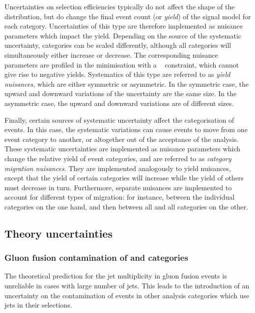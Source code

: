 Uncertainties on selection efficiencies typically do not affect the shape of the \mgg distribution, but do change the final event count (or \emph{yield}) of the signal model for each category. Uncertainties of this type are therefore implemented as nuisance parameters which impact the yield. Depending on the source of the systematic uncertainty, categories can be scaled differently, although all categories will simultaneously either increase or decrease. The corresponding nuisance parameters are profiled in the \NLL minimisation with a \lnN~\cite{1987lognormal} constraint, which cannot give rise to negative yields. Systematics of this type are referred to as \emph{yield nuisances}, which are either symmetric or asymmetric. In the symmetric case, the upward and downward variations of the uncertainty are the same size. In the asymmetric case, the upward and downward variations are of different sizes.

Finally, certain sources of systematic uncertainty affect the categorisation of events. In this case, the systematic variations can cause events to move from one event category to another, or altogether out of the acceptance of the analysis. These systematic uncertainties are implemented as nuisance parameters which change the relative yield of event categories, and are referred to as \emph{category migration nuisances}. They are implemented analogously to yield nuisances, except that the yield of certain categories will increase while the yield of others must decrease in turn. Furthermore, separate nuisances are implemented to account for different types of migration: for instance, between the individual \VBFTag categories on the one hand, and then between all \VBFTag and all \Untagged categories on the other.

\subsection{Theory uncertainties}

\subsubsection{Gluon fusion contamination of \VBFTag and \TTHTag categories}
The theoretical prediction for the jet multiplicity in gluon fusion events is unreliable in cases with large number of jets. This leads to the introduction of an uncertainty on the contamination of \ggH events in other analysis categories which use jets in their selections. 

